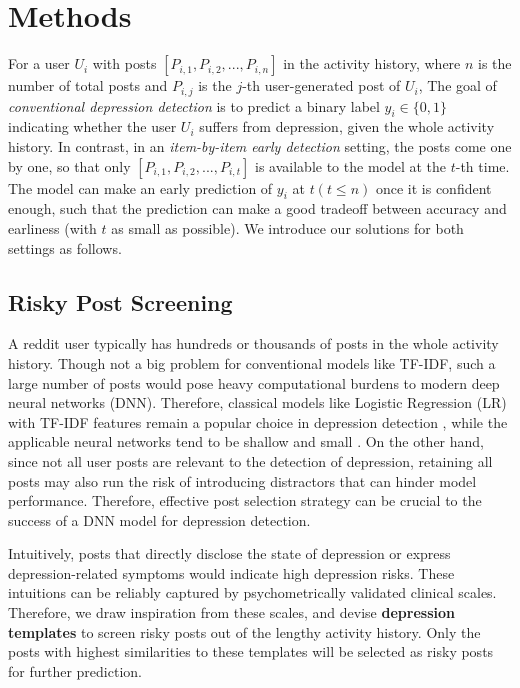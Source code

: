 \section{Methods}


For a user $U_i$ with posts $[P_{i,1}, P_{i,2}, ..., P_{i,n}]$ in the activity history, where $n$ is the number of total posts and $P_{i,j}$ is the $j$-th user-generated post of $U_i$, The goal of \textit{conventional depression detection} is to predict a binary label $y_i \in \{0, 1\}$ indicating whether the user $U_i$ suffers from depression, given the whole activity history. In contrast, in an \textit{item-by-item early detection} setting, the posts come one by one, so that only $[P_{i,1}, P_{i,2}, ..., P_{i,t}]$ is available to the model at the $t$-th time. The model can make an early prediction of $y_i$ at $t (t \leq n)$ once it is confident enough, such that the prediction can make a good tradeoff between accuracy and earliness (with $t$ as small as possible). We introduce our solutions for both settings as follows. 

\subsection{Risky Post Screening}
\label{sec:screening}

A reddit user typically has hundreds or thousands of posts in the whole activity history. Though not a big problem for conventional models like TF-IDF, such a large number of posts would pose heavy computational burdens to modern deep neural networks (DNN). Therefore, classical models like Logistic Regression (LR) with TF-IDF features remain a popular choice in depression detection \citep{zhou2021detecting}, while the applicable neural networks tend to be shallow and small \citep{yates2017depression}. On the other hand, since not all user posts are relevant to the detection of depression, retaining all posts may also run the risk of introducing distractors that can hinder model performance. Therefore, effective post selection strategy can be crucial to the success of a DNN model for depression detection. 

Intuitively, posts that directly disclose the state of depression or express depression-related symptoms would indicate high depression risks. These intuitions can be reliably captured by psychometrically validated clinical scales. Therefore, we draw inspiration from these scales, and devise \textbf{depression templates} to screen risky posts out of the lengthy activity history. Only the posts with highest similarities to these templates will be selected as risky posts for further prediction.

